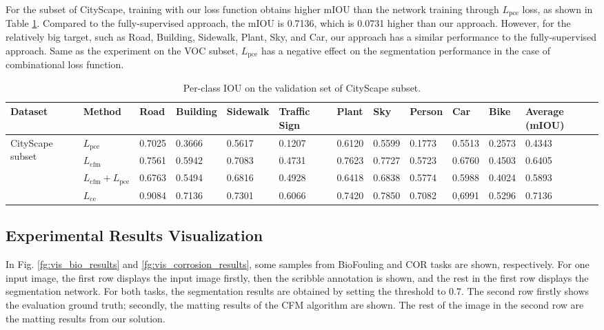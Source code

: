 \documentclass[journal]{IEEEtran}
\begin{document}
For the subset of CityScape, training with our loss function obtains higher mIOU than the network training through $L_{\text{pce}}$ loss, as shown in Table \ref{tab:tab_ablation_cityscape}. Compared to the fully-supervised approach, the mIOU is 0.7136, which is 0.0731 higher than our approach. However, for the relatively big target, such as Road, Building, Sidewalk, Plant, Sky, and Car, our approach has a similar performance to the fully-supervised approach. Same as the experiment on the VOC subset, $L_{\text{pce}}$ has a negative effect on the segmentation performance in the case of combinational loss function.

\begin{table}[t]
    \centering
    \caption{Per-class IOU on the validation set of CityScape subset.}
    \label{tab:tab_ablation_cityscape}
    \begin{tabular}{p{1.5cm}|p{1.5cm}|p{0.8cm}p{0.8cm}p{0.8cm}p{0.8cm}p{0.8cm}p{0.8cm}p{0.8cm}p{0.8cm}p{0.8cm}|p{1.5cm}}
        \toprule
        \textbf{Dataset} & \textbf{Method} & \textbf{Road} &\textbf{Building} & \textbf{Sidewalk} & \textbf{Traffic Sign} & \textbf{Plant} & \textbf{Sky} & \textbf{Person} & \textbf{Car} & \textbf{Bike} & \textbf{Average (mIOU)} \\
        \midrule %
        \multirow{3}{1.5cm}{CityScape subset}
        & $L_{\text{pce}}                 $     & 0.7025       & 0.3666       & 0.5617   & 0.1207   & 0.6120   & 0.5599   & 0.1773   & 0.5513   & 0.2573   & 0.4343         \\
        & $L_{\text{cfm}}                 $     & 0.7561       & 0.5942       & 0.7083   & 0.4731   & 0.7623   & 0.7727   & 0.5723   & 0.6760   & 0.4503   & 0.6405         \\
        & $L_{\text{cfm}}+L_{\text{pce}}  $     & 0.6763       & 0.5494       & 0.6816   & 0.4928   & 0.6418   & 0.6838   & 0.5774   & 0.5988   & 0.4024   & 0.5893         \\
        & $L_{\text{ce}}                  $     & 0.9084       & 0.7136       & 0.7301   & 0.6066   & 0.7420   & 0.7850   & 0.7082   & 0,6991   & 0.5296   & 0.7136         \\
        \bottomrule
    \end{tabular}
\end{table}




\subsection{Experimental Results Visualization}
\label{sec:vis_exp_results}
In Fig. \ref{fg:vis_bio_results} and \ref{fg:vis_corrosion_results}, some samples from BioFouling and COR tasks are shown, respectively. For one input image, the first row displays the input image firstly, then the scribble annotation is shown, and the rest in the first row displays the segmentation network. For both tasks, the segmentation results are obtained by setting the threshold to 0.7. The second row firstly shows the evaluation ground truth; secondly, the matting results of the CFM algorithm are shown. The rest of the image in the second row are the matting results from our solution.
\end{document}
